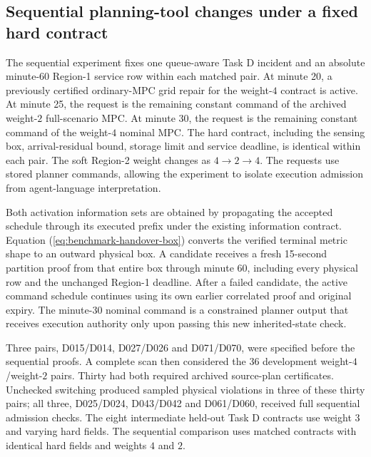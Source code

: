 \documentclass[preprint,12pt]{elsarticle}
\numberwithin{equation}{section}
\begin{document}
\subsection{Sequential planning-tool changes under a fixed hard contract}
\label{app:sequential-handover}
The sequential experiment fixes one queue-aware Task D incident and an
absolute minute-60 Region-1 service row within each matched pair. At minute
20, a previously certified ordinary-MPC grid repair for the weight-$4$
contract is active. At minute 25, the request is the remaining constant
command of the archived weight-$2$ full-scenario MPC. At minute 30, the
request is the remaining constant command of the weight-$4$ nominal MPC.
The hard contract, including the sensing box, arrival-residual bound,
storage limit and service deadline, is identical within each pair. The
soft Region-2 weight changes as $4\to2\to4$. The requests use stored
planner commands, allowing the experiment to isolate execution admission
from agent-language interpretation.

Both activation information sets are obtained by propagating the accepted
schedule through its executed prefix under the existing information contract. Equation
(\ref{eq:benchmark-handover-box}) converts the verified terminal metric
shape to an outward physical box. A candidate receives a fresh 15-second
partition proof from that entire box through minute 60, including every
physical row and the unchanged Region-1 deadline. After a failed candidate,
the active command schedule continues using its own earlier correlated
proof and original expiry. The minute-30 nominal command is a constrained
planner output that receives execution authority only upon passing this
new inherited-state check.

Three pairs, D015/D014, D027/D026 and D071/D070, were specified before
the sequential proofs. A complete scan then considered the 36 development
weight-$4$/weight-$2$ pairs. Thirty had both required archived source-plan
certificates. Unchecked switching produced sampled physical violations in
three of these thirty pairs; all three, D025/D024, D043/D042 and D061/D060,
received full sequential admission checks. The eight intermediate held-out
Task D contracts use weight $3$ and varying hard fields. The sequential
comparison uses matched contracts with identical hard fields and weights
$4$ and $2$.
\end{document}
